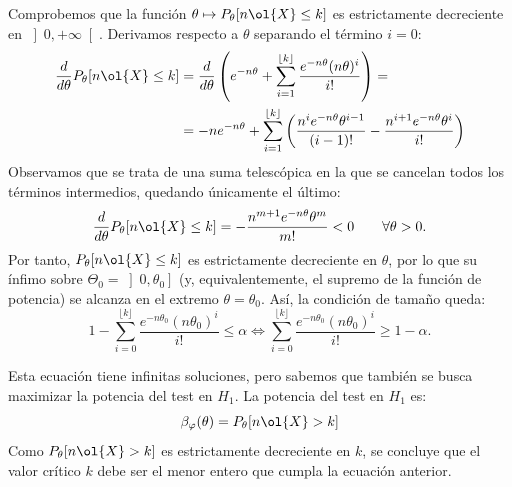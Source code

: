 \begin{ejemplo}
\begin{itemize}
\begin{itemize}
            Comprobemos que la función $\theta \mapsto P_\theta[n\ol{X} \leq k]$ es estrictamente decreciente en $\left]0, +\infty\right[$. Derivamos respecto a $\theta$ separando el término $i = 0$:
            \begin{align*}
                \frac{d}{d\theta} P_\theta[n\ol{X} \leq k] &= \frac{d}{d\theta} \left(e^{-n\theta} + \sum\limits_{i=1}^{\lfloor k \rfloor} \frac{e^{-n\theta}(n\theta)^i}{i!}\right) =\\&= -n e^{-n\theta} + \sum\limits_{i=1}^{\lfloor k \rfloor} \left(\frac{n^i e^{-n\theta}\theta^{i-1}}{(i-1)!} - \frac{n^{i+1} e^{-n\theta}\theta^i}{i!}\right)
            \end{align*}
            Observamos que se trata de una suma telescópica en la que se cancelan todos los términos intermedios, quedando únicamente el último:
            \begin{equation*}
                \frac{d}{d\theta} P_\theta[n\ol{X} \leq k] = -\frac{n^{m+1} e^{-n\theta}\theta^m}{m!} < 0 \qquad \forall \theta > 0.
            \end{equation*}
            Por tanto, $P_\theta[n\ol{X} \leq k]$ es estrictamente decreciente en $\theta$, por lo que su ínfimo sobre $\Theta_0 = \left]0, \theta_0\right]$ (y, equivalentemente, el supremo de la función de potencia) se alcanza en el extremo $\theta = \theta_0$. Así, la condición de tamaño queda:
            \begin{equation*}
                1 - \sum\limits_{i=0}^{\lfloor k \rfloor} \frac{e^{-n\theta_0}(n\theta_0)^i}{i!} \leq \alpha \iff \sum\limits_{i=0}^{\lfloor k \rfloor} \frac{e^{-n\theta_0}(n\theta_0)^i}{i!} \geq 1 - \alpha.
            \end{equation*}
            

            Esta ecuación tiene infinitas soluciones, pero sabemos que también se busca maximizar la potencia del test en $H_1$. La potencia del test en $H_1$ es:
            \begin{equation*}
                \beta_\varphi(\theta) = P_\theta[n\ol{X}> k]
            \end{equation*}
            Como $P_\theta[n\ol{X}> k]$ es estrictamente decreciente en $k$, se concluye que el valor crítico $k$ debe ser el menor entero que cumpla la ecuación anterior.\\


\end{itemize}
\end{itemize}
\end{ejemplo}
